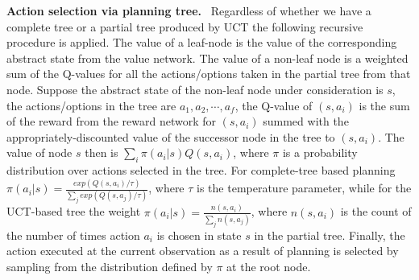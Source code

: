 \documentclass[nohyperref]{article}
\theoremstyle{plain}
\theoremstyle{definition}
\theoremstyle{remark}
\newcommand{\vivek}[1]{{\color{cyan}{\small\bf\sf [Vivek: #1]}}}
\renewcommand{\paragraph}[1]{\textbf{#1}\ }
\newcommand{\state}{\mathbf{s}}
\newcommand{\action}{\mathbf{a}}
\begin{document}
\paragraph{Action selection via planning tree.\label{par:value_backup}}
Regardless of whether we have a complete tree or a partial tree produced by UCT the following recursive procedure is applied. The value of a leaf-node is the value of the corresponding abstract state from the value network. The value of a non-leaf node is a weighted sum of the Q-values for all the actions/options taken in the partial tree from that node. Suppose the abstract state of the non-leaf node under consideration is $s$, the actions/options in the tree are $a_1,a_2,\cdots,a_f$, the Q-value of $(s,a_i)$ is the sum of the reward from the reward network for $(s,a_i)$ summed with the appropriately-discounted value of the successor node in the tree to $(s,a_i)$. The value of node $s$ then is $\sum_i \pi(a_i|s) Q(s,a_i)$, where $\pi$ is a probability distribution over actions selected in the tree.  For complete-tree based planning $\pi(a_i|s) = \frac{exp(Q(s,a_i) / \tau)}{\sum_j exp(Q(s,a_j) / \tau)} $, where $\tau$ is the temperature parameter, while for the UCT-based tree the weight $\pi(a_i|s) = \frac{n(s,a_i)}{\sum_j n(s,a_j)}$, where $n(s,a_i)$ is the count of the number of times action $a_i$ is chosen in state $s$ in the partial tree. Finally, the action executed at the current observation as a result of planning is selected by sampling from the distribution defined by $\pi$ at the root node.

\end{document}
